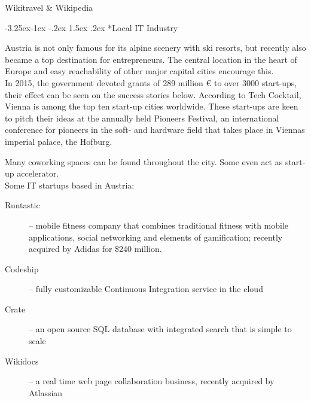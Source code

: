 \documentclass[10pt,a4paper]{article}
\makeatletter
\renewcommand\subsection{%
\@startsection{subsection}{2}{\z@}%
              {-3.25ex\@plus -1ex \@minus -.2ex}%
              {1.5ex \@plus .2ex}%
              {\color{kdelight}\sffamily\Large\bfseries}}
\makeatother
\begin{document}
\begin{flushright}Wikitravel \& Wikipedia\end{flushright}

\subsection*{Local IT Industry}
Austria is not only famous for its alpine scenery with ski resorts, but recently also became a top destination for entrepreneurs. The central location in the heart of Europe and easy reachability of other major capital cities encourage this.\\

In 2015, the government devoted grants of 289 million \euro{} to over 3000 start-ups, their effect can be seen on the success stories below. According to Tech Cocktail, Vienna is among the top ten start-up cities worldwide. These start-ups are keen to pitch their ideas at the annually held Pioneers Festival, an international conference for pioneers in the soft- and hardware field that takes place in Viennas imperial palace, the Hofburg.

Many coworking spaces can be found throughout the city. Some even act as start-up accelerator.\\


Some IT startups based in Austria:
\begin{description}
	\item[\color{kdedarker} Runtastic]  -- mobile fitness company that combines traditional fitness with mobile applications, social networking and elements of gamification; recently acquired by Adidas for \$240 million.
	\item[\color{kdedarker} Codeship] -- fully customizable Continuous Integration service in the cloud
	\item[\color{kdedarker} Crate] -- an open source SQL database with integrated search that is simple to scale
	\item[\color{kdedarker} Wikidocs] -- a real time web page collaboration business, recently acquired by Atlassian
\end{description}
\end{document}
